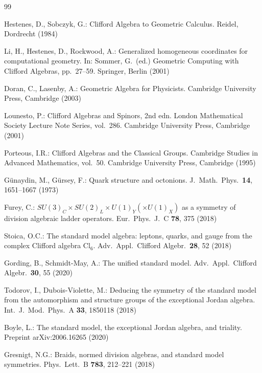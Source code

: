 \documentclass{birkjour}
\theoremstyle{definition}
\theoremstyle{remark}
\numberwithin{equation}{section}
\newcommand{\Cl}{\mathrm{Cl}}
\begin{document}
\begin{thebibliography}{99}

Hestenes, D., Sobczyk, G.:
Clifford Algebra to Geometric Calculus.
Reidel, Dordrecht (1984)

Li, H., Hestenes, D., Rockwood, A.:
Generalized homogeneous coordinates for computational
geometry.
In: Sommer, G.\ (ed.) Geometric Computing with Clifford
Algebras, pp.~27--59. Springer, Berlin (2001)

Doran, C., Lasenby, A.:
Geometric Algebra for Physicists.
Cambridge University Press, Cambridge (2003)

Lounesto, P.:
Clifford Algebras and Spinors, 2nd edn.
London Mathematical Society Lecture Note Series, vol.~286.
Cambridge University Press, Cambridge (2001)

Porteous, I.R.:
Clifford Algebras and the Classical Groups.
Cambridge Studies in Advanced Mathematics, vol.~50.
Cambridge University Press, Cambridge (1995)

G\"unaydin, M., G\"ursey, F.:
Quark structure and octonions.
J.\ Math.\ Phys.\ \textbf{14}, 1651--1667 (1973)

Furey, C.:
$SU(3)_C\times SU(2)_L\times U(1)_Y(\times U(1)_X)$ as a
symmetry of division algebraic ladder operators.
Eur.\ Phys.\ J.\ C \textbf{78}, 375 (2018)

Stoica, O.C.:
The standard model algebra: leptons, quarks, and gauge
from the complex Clifford algebra $\Cl_6$.
Adv.\ Appl.\ Clifford Algebr.\ \textbf{28}, 52 (2018)

Gording, B., Schmidt-May, A.:
The unified standard model.
Adv.\ Appl.\ Clifford Algebr.\ \textbf{30}, 55 (2020)

Todorov, I., Dubois-Violette, M.:
Deducing the symmetry of the standard model from the
automorphism and structure groups of the exceptional
Jordan algebra.
Int.\ J.\ Mod.\ Phys.\ A \textbf{33}, 1850118 (2018)

Boyle, L.:
The standard model, the exceptional Jordan algebra, and
triality.
Preprint arXiv:2006.16265 (2020)

Gresnigt, N.G.:
Braids, normed division algebras, and standard model
symmetries.
Phys.\ Lett.\ B \textbf{783}, 212--221 (2018)


\end{thebibliography}
\end{document}
